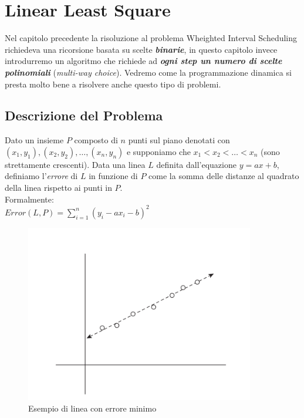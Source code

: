 \chapter{Linear Least Square}

Nel capitolo precedente la risoluzione al problema Wheighted Interval
Scheduling richiedeva una ricorsione basata su scelte
\textbf{\emph{binarie}}, in questo capitolo invece introdurremo un
algoritmo che richiede ad \textbf{\emph{ogni step un numero di scelte
    polinomiali}} (\emph{multi-way choice}). Vedremo come la programmazione
dinamica si presta molto bene a risolvere anche questo tipo di problemi.

\section{Descrizione del Problema}

\begin{myblockquote}
  Dato un insieme $P$ composto di $n$ punti sul piano denotati con
  $(x_1, y_1), (x_2, y_2), \ldots, (x_n, y_n)$ e supponiamo che
  $x_1 < x_2 < \ldots < x_n$ (sono strettamente crescenti). Data una
  linea $L$ definita dall'equazione $y = ax + b$, definiamo
  l'\emph{errore} di $L$ in funzione di $P$ come la somma delle
  distanze al quadrato della linea rispetto ai punti in $P$.\\
  
  Formalmente:\\
  $Error(L, P) = \sum_{i=1}^{n} (y_i - ax_i - b)^2$
\end{myblockquote}

\begin{figure}[H]
\centering
\includegraphics[width = 10cm, keepaspectratio]{Programmazione_dinamica/imgs/best_fit.png}
\caption{Esempio di linea con errore minimo}
\end{figure}

